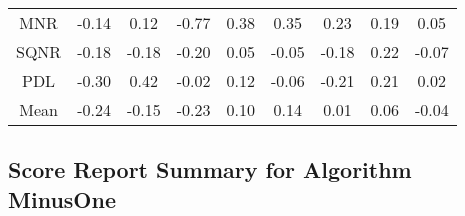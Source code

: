 \begin{longtable}{ | c || c | c | c | c | c | c | c || c |}
MNR &  \cellcolor[HTML]{FFFFFF} -0.14 &  \cellcolor[HTML]{FFFFFF} 0.12 &  \cellcolor[HTML]{FFEFEF} -0.77 &  \cellcolor[HTML]{F7F7FF} 0.38 &  \cellcolor[HTML]{F7F7FF} 0.35 &  \cellcolor[HTML]{F7F7FF} 0.23 &  \cellcolor[HTML]{F7F7FF} 0.19 &  \cellcolor[HTML]{FFFFFF} 0.05 \\
SQNR &  \cellcolor[HTML]{FFF7F7} -0.18 &  \cellcolor[HTML]{FFF7F7} -0.18 &  \cellcolor[HTML]{FFF7F7} -0.20 &  \cellcolor[HTML]{FFFFFF} 0.05 &  \cellcolor[HTML]{FFFFFF} -0.05 &  \cellcolor[HTML]{FFF7F7} -0.18 &  \cellcolor[HTML]{F7F7FF} 0.22 &  \cellcolor[HTML]{FFFFFF} -0.07 \\
PDL &  \cellcolor[HTML]{FFF7F7} -0.30 &  \cellcolor[HTML]{F7F7FF} 0.42 &  \cellcolor[HTML]{FFFFFF} -0.02 &  \cellcolor[HTML]{FFFFFF} 0.12 &  \cellcolor[HTML]{FFFFFF} -0.06 &  \cellcolor[HTML]{FFF7F7} -0.21 &  \cellcolor[HTML]{F7F7FF} 0.21 &  \cellcolor[HTML]{FFFFFF} 0.02 \\
\hline
\hline
Mean  &  \cellcolor[HTML]{FFF7F7} -0.24 &  \cellcolor[HTML]{FFFFFF} -0.15 &  \cellcolor[HTML]{FFF7F7} -0.23 &  \cellcolor[HTML]{FFFFFF} 0.10 &  \cellcolor[HTML]{FFFFFF} 0.14 &  \cellcolor[HTML]{FFFFFF} 0.01 &  \cellcolor[HTML]{FFFFFF} 0.06 &  \cellcolor[HTML]{FFFFFF} -0.04 \\
\hline
\end{longtable}

\subsection*{Score Report Summary for Algorithm MinusOne}

